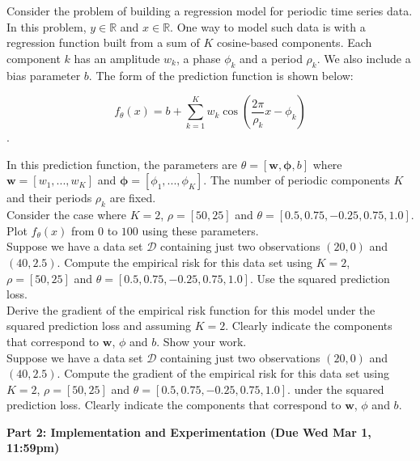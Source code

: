 \documentclass[11pt]{article}
\newcommand{\mbf}[1]{{\mathbf{#1}}}
\begin{document}
\begin{problem}{20} Consider the problem of building a regression model for periodic time series data. In this problem, $y\in\mathbb{R}$ and $x\in\mathbb{R}$. One way to model such data is with a regression function built from a sum of $K$ cosine-based components. Each component $k$ has an amplitude $w_k$, a phase $\phi_k$ and a period $\rho_k$. We also include a bias parameter $b$. The form of the prediction function is shown below:     

$$f_{\theta}(x) = b + \sum_{k=1}^K w_k \cos\left(\frac{2\pi}{\rho_k}x-\phi_k\right)$$.

In this prediction function, the parameters are $\theta=[\mbf{w}, \mbf{\phi}, b]$ where $\mbf{w}=[w_1,...,w_K]$ and $\mbf{\phi}=[\phi_1,...,\phi_K]$. The number of periodic components $K$ and their periods $\rho_k$ are fixed.\\ 

 Consider the case where $K=2$, $\rho=[50,25]$
and $\theta=[0.5,0.75,-0.25,0.75,1.0]$. Plot $f_{\theta}(x)$ from $0$ to $100$ using these parameters.\\

 Suppose we have a data set $\mathcal{D}$ containing just two observations $(20,0)$ and $(40,2.5)$. Compute the empirical risk for this data set using $K=2$, $\rho=[50,25]$ and $\theta=[0.5,0.75,-0.25,0.75,1.0]$. Use the squared prediction loss.\\

 Derive the gradient of the empirical risk function for this model under the squared prediction loss and assuming $K=2$. Clearly indicate the components that correspond to $\mbf{w}$, $\phi$ and $b$. Show your work.\\

 Suppose we have a data set $\mathcal{D}$ containing just two observations $(20,0)$ and $(40,2.5)$. Compute the gradient of the empirical risk for this data set using $K=2$, $\rho=[50,25]$ and $\theta=[0.5,0.75,-0.25,0.75,1.0]$. under the squared prediction loss. Clearly indicate the components that correspond to $\mbf{w}$, $\phi$ and $b$.\\

\end{problem}


\vspace{1em}
\textbf{Part 2: Implementation and Experimentation (Due Wed Mar 1, 11:59pm)}
\end{document}
